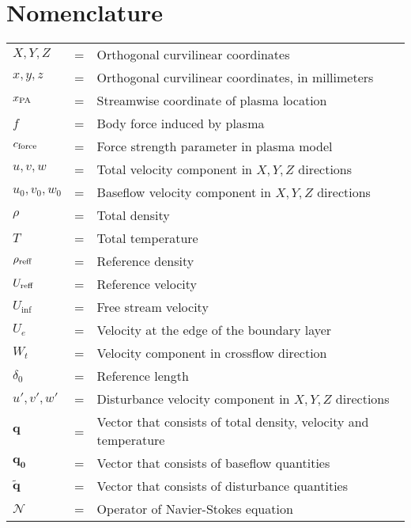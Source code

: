 \documentclass{AIAA}
\begin{document}
\maketitle

\section*{Nomenclature}
\noindent\begin{tabular}{@{}lcl@{}}
$X,Y,Z$               &=& Orthogonal curvilinear coordinates \\
$x,y,z$               &=& Orthogonal curvilinear coordinates, in millimeters \\
$x_{\rm PA}$          &=& Streamwise coordinate of plasma location\\
$f$                   &=& Body force induced by plasma \\
$c_{\rm force}$       &=& Force strength parameter in plasma model \\
$u,v,w$               &=& Total velocity component in $X,Y,Z$ directions \\
$u_0,v_0,w_0$         &=& Baseflow velocity component in $X,Y,Z$ directions \\
$\rho$                &=& Total density \\
$T$                   &=& Total temperature \\
$\rho_{\rm reff}$     &=& Reference density \\
$U_{\rm reff}$        &=& Reference velocity \\
$U_{\inf}$            &=& Free stream velocity \\
$U_{e}$               &=& Velocity at the edge of the boundary layer\\
$W_t$                 &=& Velocity component in crossflow direction\\
$\delta_0$            &=& Reference length \\
$u',v',w'$            &=& Disturbance velocity component in $X,Y,Z$ directions \\
$\mathbf{q}$          &=& Vector that consists of total density, velocity and temperature \\
$\mathbf{q_0}$        &=& Vector that consists of baseflow quantities \\
$\mathbf{\tilde{q}}$  &=& Vector that consists of disturbance quantities \\
$\mathscr{N}$         &=& Operator of Navier-Stokes equation \\

\end{tabular}
\end{document}
